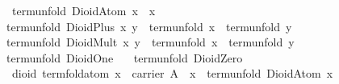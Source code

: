 \begin{isabellebody}
\ \ {}term{}unfold\ {}DioidAtom\ x{}\ {}\ x{}\isanewline
{}\ {}term{}unfold\ {}DioidPlus\ x\ y{}\ {}\ {}term{}unfold\ x{}\ {}\ {}term{}unfold\ y{}{}\isanewline
{}\ {}term{}unfold\ {}DioidMult\ x\ y{}\ {}\ {}term{}unfold\ x{}\ {}\ {}term{}unfold\ y{}{}\isanewline
{}\ {}term{}unfold\ DioidOne\ {}\ {}{}\isanewline
{}\ {}term{}unfold\ DioidZero\ {}\ {}{}\isanewline
\isanewline
{}\isamarkupfalse%
\ {}\ dioid{}\ term{}fold{}atom{}\ {}x\ {}\ carrier\ A\ {}\ x\ {}\ term{}unfold\ {}DioidAtom\ x{}{}\isanewline
%
\isadelimproof

\end{isabellebody}
